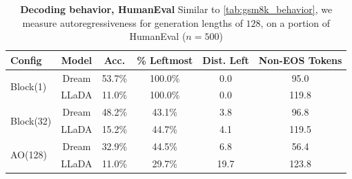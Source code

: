 \begin{table}[h]
    \centering
   
    \begin{tabular}{l c cccc}
        \toprule
        \textbf{Config} & \textbf{Model} & \textbf{Acc.} & \textbf{\% Leftmost} & \textbf{Dist. Left} & \textbf{Non-EOS Tokens} \\
        \midrule
        \multirow{2}{*}{Block(1)}     
            & Dream  & 53.7\% & 100.0\% & 0.0 & 95.0  \\
            & LLaDA  & 11.0\% & 100.0\% & 0.0 & 119.8 \\
                        \midrule

        \multirow{2}{*}{Block(32)}  
            & Dream  & 48.2\% & 43.1\%  & 3.8 & 96.8  \\
            & LLaDA  & 15.2\% & 44.7\%  & 4.1 & 119.5 \\
            \midrule
        \multirow{2}{*}{AO(128)} 
            & Dream  & 32.9\% & 44.5\%  & 6.8 & 56.4  \\
            & LLaDA  & 11.0\% & 29.7\%  & 19.7 & 123.8 \\
        \bottomrule
    \end{tabular}
            \label{tab:humaneval_behavior}
              \caption{\textbf{Decoding behavior, HumanEval} Similar to \cref{tab:gsm8k_behavior}, we measure autoregressiveness for generation lengths of $128$, on a portion of HumanEval ($n=500$)}
\end{table}





































   



   


    
    
      

